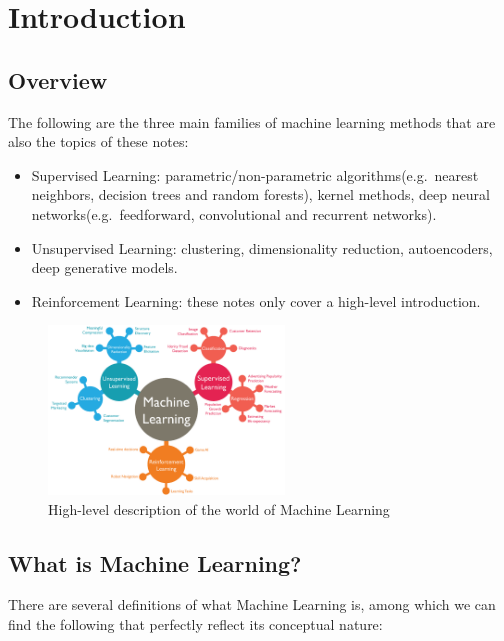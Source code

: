 \section{Introduction}

\subsection{Overview}
The following are the three main families of machine learning methods that are also the topics of these notes:

\begin{itemize}
    \item Supervised Learning: parametric/non-parametric algorithms(e.g.\ nearest neighbors, decision trees and random forests), kernel methods, deep neural networks(e.g.\ feedforward, convolutional and recurrent networks).
    \item Unsupervised Learning: clustering, dimensionality reduction, autoencoders, deep generative models.
    \item Reinforcement Learning: these notes only cover a high-level introduction.
\end{itemize}

\vspace{20mm}

\begin{figure}[h]
    \centering
    \includegraphics[width=0.56\textwidth]{../img/World_of_ML}
    \caption{High-level description of the world of Machine Learning}
\end{figure}

\subsection{What is Machine Learning?}
There are several definitions of what Machine Learning is, among which we can find the following that perfectly reflect its conceptual nature:

\vspace{5mm}

